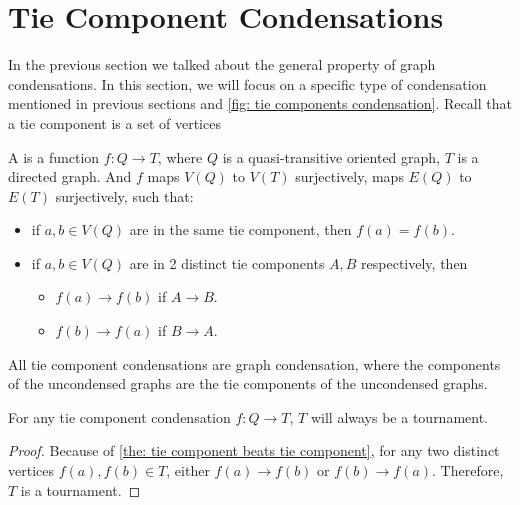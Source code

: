\section{Tie Component Condensations}

In the previous section we talked about the general property
of graph condensations.
In this section, we will focus on a specific type of condensation
mentioned in previous sections and
\cref{fig: tie components condensation}.
Recall that a tie component is a set of vertices

\begin{definition}
  A  is a
  function \(f: Q \to T\),
  where \(Q\) is a quasi-transitive oriented graph,
  \(T\) is a directed graph.
  And \(f\) maps \(V(Q)\) to \(V(T)\) surjectively,
  maps \(E(Q)\) to \(E(T)\) surjectively,
  such that:
  \begin{itemize}
    \item if \(a, b \in V(Q)\) are in the same tie component,
      then \(f(a) = f(b)\).
    \item if \(a, b \in V(Q)\) are in 2 distinct tie components
      \(A, B\) respectively,
      then
      \begin{itemize}
        \item \(f(a) \to f(b)\) if \(A \to B\).
        \item \(f(b) \to f(a)\) if \(B \to A\).
      \end{itemize}
  \end{itemize}
\end{definition}

\begin{corollary}\label{the: tie condensation are condensation}
  All tie component condensations are graph condensation,
  where the components of the uncondensed graphs
  are the tie components of the uncondensed graphs.
\end{corollary}

\begin{corollary}\label{the: tie condensation results in tournament}
  For any tie component condensation \(f: Q \to T\),
  \(T\) will always be a tournament.
\end{corollary}
\begin{proof}
  Because of \cref{the: tie component beats tie component},
  for any two distinct vertices \(f(a), f(b) \in T\),
  either \(f(a) \to f(b)\) or \(f(b) \to f(a)\).
  Therefore, \(T\) is a tournament.
\end{proof}


